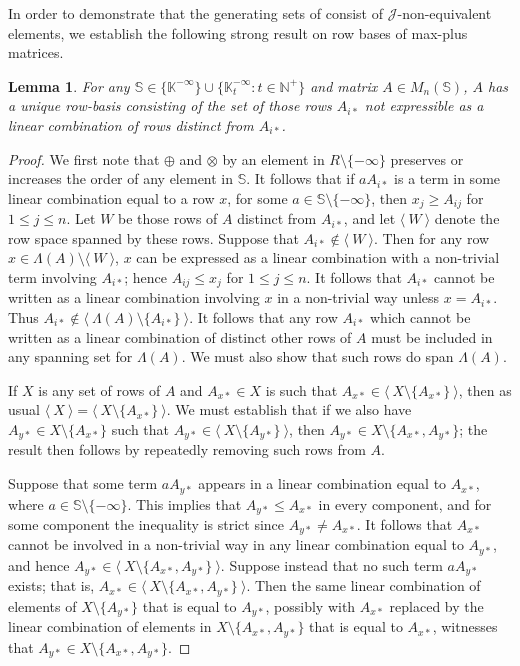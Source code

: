 \documentclass[11pt]{article}
\newtheorem{lemma}[thm]{Lemma}
\numberwithin{equation}{section}
\newcommand{\set}[2]{\ensuremath{\{#1 : #2 \}}}
\newcommand{\genset}[1]{\ensuremath{\langle\: #1 \:\rangle}}
\renewcommand{\S}{\mathbb{S}}
\newcommand{\J}{\mathscr{J}}
\newcommand{\N}{\mathbb{N}}
\newcommand{\Np}{\N^{+}}
\newcommand{\K}{\mathbb{K}}
\newcommand{\Kmax}{\K^{-\infty}}
\newcommand{\Kmaxt}{\K^{-\infty}_t}
\newcommand{\RowS}{\Lambda}
\begin{document}
In order to demonstrate that the generating sets of
 consist of $\J$-non-equivalent elements, we establish
the following strong result on row bases of max-plus matrices.
\begin{lemma}
  For any $\S \in \{\Kmax\} \cup \set{\Kmaxt}{t \in \Np}$ and matrix $A \in
  M_n(\S)$, $A$ has a unique row-basis consisting of the set of those rows
  $A_{i*}$ not expressible as a linear combination of rows distinct from
  $A_{i*}$.
\end{lemma}
\begin{proof}
We first note that $\oplus$ and $\otimes$ by an element in
$R\setminus\{-\infty\}$ preserves or increases the order of any element in $\S$.
It follows that if $aA_{i*}$ is a term in some linear combination equal to a row
$x$, for some $a \in \S\setminus\{-\infty\}$, then $x_j \geq A_{ij}$ for $1 \leq
j \leq n$. Let $W$ be those rows of $A$ distinct from $A_{i*}$, and let
$\genset{W}$ denote the row space spanned by these rows. Suppose that $A_{i*}
\not\in \genset{W}$. Then for any row $x \in \RowS(A)\setminus \genset{W}$, $x$
can be expressed as a linear combination with a non-trivial term involving
$A_{i*}$; hence $A_{ij} \leq x_j$ for $1 \leq j \leq n$. It follows that
$A_{i*}$ cannot be written as a linear combination involving $x$ in a
non-trivial way unless $x = A_{i*}$. Thus $A_{i*} \not\in \genset{\RowS(A)
  \setminus \{ A_{i*} \}}$. It follows that any row $A_{i*}$ which cannot be
written as a linear combination of distinct other rows of $A$ must be included
in any spanning set for $\RowS(A)$. We must also show that such rows do span
$\RowS(A)$.

If $X$ is any set of rows of $A$ and $A_{x*} \in X$ is such that $A_{x*} \in
\genset{X \setminus\{A_{x*}\}}$, then as usual $\genset{X} = \genset{X \setminus
  \{A_{x*}\}}$. We must establish that if we also have $A_{y*} \in X\setminus\{A_{x*}\}$
such that $A_{y*} \in \genset{X\setminus\{A_{y*}\}}$, then $A_{y*} \in
X\setminus\{A_{x*}, A_{y*}\}$; the result then follows by repeatedly removing
such rows from $A$. 

Suppose that some term $aA_{y*}$ appears in a linear combination equal
to $A_{x*}$, where $a \in \S\setminus\{-\infty\}$. This implies that $A_{y*} \leq
A_{x*}$ in every component, and for some component the inequality is strict since
$A_{y*} \neq A_{x*}$. It follows that $A_{x*}$ cannot be involved in a
non-trivial way in any linear combination equal to $A_{y*}$, and hence $A_{y*}
\in \genset{X \setminus\{A_{x*}, A_{y*}\}}$. Suppose instead that no such term
$aA_{y*}$ exists; that is, $A_{x*} \in \genset{X \setminus\{A_{x*}, A_{y*}\}}$.
Then the same linear combination of elements of $X\setminus\{A_{y*}\}$ that is
equal to $A_{y*}$, possibly with $A_{x*}$ replaced by the linear
combination of elements in $X \setminus\{A_{x*}, A_{y*}\}$ that is equal to
$A_{x*}$, witnesses that $A_{y*} \in X\setminus\{A_{x*}, A_{y*}\}$.
\end{proof}
\end{document}
